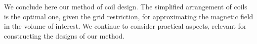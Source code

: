 We conclude here our method of coil design. The simplified arrangement of coils is the optimal one, given the grid restriction, for approximating the magnetic field in the volume of interest. We continue to consider practical aspects, relevant for constructing the designs of our method.




%




